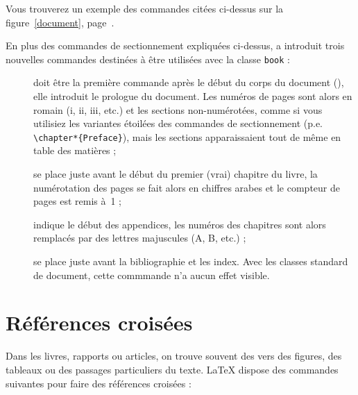 Vous trouverez un exemple des commandes citées ci-dessus sur la
figure~\ref{document}, page~\pageref{document}.

En plus des commandes de sectionnement expliquées ci-dessus, \LaTeXe{}
a introduit trois nouvelles commandes destinées à être utilisées avec
la classe \texttt{book} :
\begin{description}
\item[] doit être la première commande après le
  \vadjust{\pagebreak[3]}%
  début du corps du document (\verb||),
    elle introduit le prologue du document.
    Les numéros de pages sont alors en romain (i, ii, iii, etc.) et
    les sections non-numérotées, comme si vous utilisiez les variantes
    étoilées des commandes de sectionnement
    (p.e. \verb|\chapter*{Preface}|), mais les sections
    apparaissaient tout de même en table des matières ;

\item[] se place juste avant le début du premier
  (vrai) chapitre du livre,  la numérotation des pages se fait alors
  en chiffres arabes et le compteur de pages est remis à~1 ;

\item[] indique le début des appendices, les numéros
  des chapitres sont alors remplacés par des lettres majuscules (A, B,
  etc.) ;

\item[] se place juste avant la bibliographie et les
  index. Avec les classes standard de document, cette commmande n'a
  aucun effet visible.
\end{description}

\section{Références croisées}

Dans les livres, rapports ou articles, on trouve souvent des
 vers des figures, des tableaux ou des passages
particuliers du texte. \LaTeX{} dispose des commandes suivantes pour
faire des références croisées :

